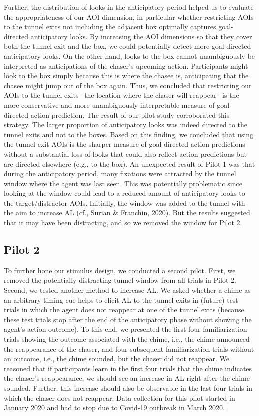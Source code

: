 \documentclass[
  english,
  man, donotrepeattitle,floatsintext]{apa6}
\begin{document}
Further, the distribution of looks in the anticipatory period helped us to evaluate the appropriateness of our AOI dimension, in particular whether restricting AOIs to the tunnel exits not including the adjacent box optimally captures goal-directed anticipatory looks. By increasing the AOI dimensions so that they cover both the tunnel exit and the box, we could potentially detect more goal-directed anticipatory looks. On the other hand, looks to the box cannot unambiguously be interpreted as anticipations of the chaser's upcoming action. Participants might look to the box simply because this is where the chasee is, anticipating that the chasee might jump out of the box again. Thus, we concluded that restricting our AOIs to the tunnel exits --the location where the chaser will reappear-- is the more conservative and more unambiguously interpretable measure of goal-directed action prediction. The result of our pilot study corroborated this strategy. The larger proportion of anticipatory looks was indeed directed to the tunnel exits and not to the boxes. Based on this finding, we concluded that using the tunnel exit AOIs is the sharper measure of goal-directed action predictions without a substantial loss of looks that could also reflect action predictions but are directed elsewhere (e.g., to the box).
An unexpected result of Pilot 1 was that during the anticipatory period, many fixations were attracted by the tunnel window where the agent was last seen. This was potentially problematic since looking at the window could lead to a reduced amount of anticipatory looks to the target/distractor AOIs. Initially, the window was added to the tunnel with the aim to increase AL (cf., Surian \& Franchin, 2020). But the results suggested that it may have been distracting, and so we removed the window for Pilot 2.

\hypertarget{pilot-2}{%
\subsection{Pilot 2}\label{pilot-2}}

To further hone our stimulus design, we conducted a second pilot. First, we removed the potentially distracting tunnel window from all trials in Pilot 2. Second, we tested another method to increase AL. We asked whether a chime as an arbitrary timing cue helps to elicit AL to the tunnel exits in (future) test trials in which the agent does not reappear at one of the tunnel exits (because these test trials stop after the end of the anticipatory phase without showing the agent's action outcome). To this end, we presented the first four familiarization trials showing the outcome associated with the chime, i.e., the chime announced the reappearance of the chaser, and four subsequent familiarization trials without an outcome, i.e., the chime sounded, but the chaser did not reappear. We reasoned that if participants learn in the first four trials that the chime indicates the chaser's reappearance, we should see an increase in AL right after the chime sounded. Further, this increase should also be observable in the last four trials in which the chaser does not reappear. Data collection for this pilot started in January 2020 and had to stop due to Covid-19 outbreak in March 2020.
\end{document}
